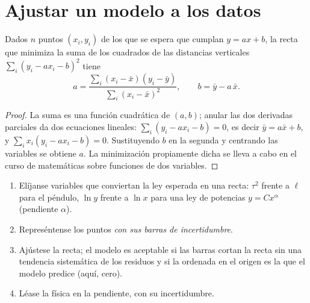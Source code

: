 \section{Ajustar un modelo a los datos}

\begin{proposition}\label{prop:b1:units-dimensions:regression}
Dados $n$ puntos $(x_i, y_i)$ de los que se espera que cumplan
$y = a x + b$, la recta que minimiza la suma de los cuadrados de las
distancias verticales $\sum_i (y_i - a x_i - b)^2$ tiene
\[
a = \frac{\sum_i (x_i - \bar x)(y_i - \bar y)}{\sum_i (x_i - \bar x)^2},
\qquad
b = \bar y - a\,\bar x .
\]
\end{proposition}

\begin{proof}
La suma es una función cuadrática de $(a, b)$; anular las dos derivadas
parciales da dos ecuaciones lineales: $\sum_i (y_i - ax_i - b) = 0$,
es decir $\bar y = a \bar x + b$, y $\sum_i x_i (y_i - ax_i - b) = 0$.
Sustituyendo $b$ en la segunda y centrando las variables se obtiene $a$.
La minimización propiamente dicha se lleva a cabo en el curso de
matemáticas sobre funciones de dos variables.
\end{proof}

\begin{method}\label{met:b1:units-dimensions:fit}
\begin{enumerate}
  \item Elíjanse variables que conviertan la ley esperada en una recta:
        $\tau^2$ frente a $\ell$ para el péndulo, $\ln y$ frente a
        $\ln x$ para una ley de potencias $y = Cx^\alpha$ (pendiente
        $\alpha$).
  \item Represéntense los puntos \emph{con sus barras de incertidumbre}.
  \item Ajústese la recta; el modelo es aceptable si las barras cortan la
        recta sin una tendencia sistemática de los residuos y si la
        ordenada en el origen es la que el modelo predice (aquí, cero).
  \item Léase la física en la pendiente, con su incertidumbre.
\end{enumerate}
\end{method}

